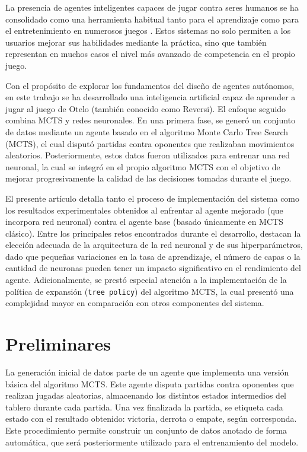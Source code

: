 \documentclass[conference]{IEEEtran}
\begin{document}
La presencia de agentes inteligentes capaces de jugar contra seres humanos se ha consolidado como una herramienta habitual tanto para el aprendizaje como para el entretenimiento en numerosos juegos \cite{russell2020}. Estos sistemas no solo permiten a los usuarios mejorar sus habilidades mediante la práctica, sino que también representan en muchos casos el nivel más avanzado de competencia en el propio juego.

Con el propósito de explorar los fundamentos del diseño de agentes autónomos, en este trabajo se ha desarrollado una inteligencia artificial capaz de aprender a jugar al juego de Otelo (también conocido como Reversi). El enfoque seguido combina MCTS y redes neuronales. En una primera fase, se generó un conjunto de datos mediante un agente basado en el algoritmo Monte Carlo Tree Search (MCTS), el cual disputó partidas contra oponentes que realizaban movimientos aleatorios. Posteriormente, estos datos fueron utilizados para entrenar una red neuronal, la cual se integró en el propio algoritmo MCTS con el objetivo de mejorar progresivamente la calidad de las decisiones tomadas durante el juego.

El presente artículo detalla tanto el proceso de implementación del sistema como los resultados experimentales obtenidos al enfrentar al agente mejorado (que incorpora red neuronal) contra el agente base (basado únicamente en MCTS clásico). Entre los principales retos encontrados durante el desarrollo, destacan la elección adecuada de la arquitectura de la red neuronal y de sus hiperparámetros, dado que pequeñas variaciones en la tasa de aprendizaje, el número de capas o la cantidad de neuronas pueden tener un impacto significativo en el rendimiento del agente. Adicionalmente, se prestó especial atención a la implementación de la política de expansión (\texttt{tree policy}) del algoritmo MCTS, la cual presentó una complejidad mayor en comparación con otros componentes del sistema.

\section{Preliminares}

La generación inicial de datos parte de un agente que implementa una versión básica del algoritmo MCTS. Este agente disputa partidas contra oponentes que realizan jugadas aleatorias, almacenando los distintos estados intermedios del tablero durante cada partida. Una vez finalizada la partida, se etiqueta cada estado con el resultado obtenido: victoria, derrota o empate, según corresponda. Este procedimiento permite construir un conjunto de datos anotado de forma automática, que será posteriormente utilizado para el entrenamiento del modelo.
\end{document}

